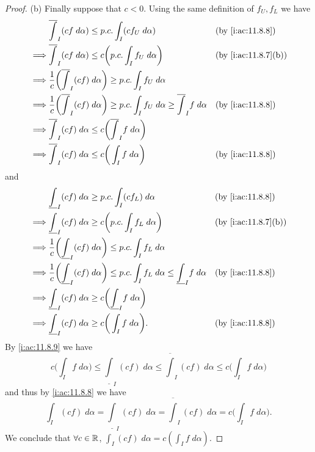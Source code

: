 \begin{proof}{(b)}
  Finally suppose that \(c < 0\).
  Using the same definition of \(f_U, f_L\) we have
  \begin{align*}
             & \overline{\int}_I (cf \; d \alpha) \leq p.c. \int_I (c f_U \; d \alpha)                                                           &  & \by{i:ac:11.8.8}    \\
    \implies & \overline{\int}_I (cf \; d \alpha) \leq c \bigg(p.c. \int_I f_U \; d \alpha\bigg)                                                 &  & \by{i:ac:11.8.7}[b] \\
    \implies & \dfrac{1}{c} \bigg(\overline{\int}_I (cf) \; d \alpha\bigg) \geq p.c. \int_I f_U \; d \alpha                                                               \\
    \implies & \dfrac{1}{c} \bigg(\overline{\int}_I (cf) \; d \alpha\bigg) \geq p.c. \int_I f_U \; d \alpha \geq \overline{\int}_I f \; d \alpha &  & \by{i:ac:11.8.8}    \\
    \implies & \overline{\int}_I (cf) \; d \alpha \leq c\bigg(\overline{\int}_I f \; d \alpha\bigg)                                                                       \\
    \implies & \overline{\int}_I (cf) \; d \alpha \leq c\bigg(\int_I f \; d \alpha\bigg)                                                         &  & \by{i:ac:11.8.8}
  \end{align*}
  and
  \begin{align*}
             & \underline{\int}_I (cf) \; d \alpha \geq p.c. \int_I (c f_L) \; d \alpha                                                            &  & \by{i:ac:11.8.8}    \\
    \implies & \underline{\int}_I (cf) \; d \alpha \geq c \bigg(p.c. \int_I f_L \; d \alpha\bigg)                                                  &  & \by{i:ac:11.8.7}[b] \\
    \implies & \dfrac{1}{c} \bigg(\underline{\int}_I (cf) \; d \alpha\bigg) \leq p.c. \int_I f_L \; d \alpha                                                                \\
    \implies & \dfrac{1}{c} \bigg(\underline{\int}_I (cf) \; d \alpha\bigg) \leq p.c. \int_I f_L \; d \alpha \leq \underline{\int}_I f \; d \alpha &  & \by{i:ac:11.8.8}    \\
    \implies & \underline{\int}_I (cf) \; d \alpha \geq c\bigg(\underline{\int}_I f \; d \alpha\bigg)                                                                       \\
    \implies & \underline{\int}_I (cf) \; d \alpha \geq c\bigg(\int_I f \; d \alpha\bigg).                                                         &  & \by{i:ac:11.8.8}
  \end{align*}
  By \cref{i:ac:11.8.9} we have
  \[
    c\bigg(\int_I f \; d \alpha\bigg) \leq \underline{\int}_I (cf) \; d \alpha \leq \overline{\int}_I (cf) \; d \alpha \leq c\bigg(\int_I f \; d \alpha\bigg)
  \]
  and thus by \cref{i:ac:11.8.8} we have
  \[
    \int_I (cf) \; d \alpha = \underline{\int}_I (cf) \; d \alpha = \overline{\int}_I (cf) \; d \alpha = c\bigg(\int_I f \; d \alpha\bigg).
  \]
  We conclude that \(\forall c \in \mathbb{R}\), \(\int_I (cf) \; d \alpha = c (\int_I f \; d \alpha)\).
\end{proof}

